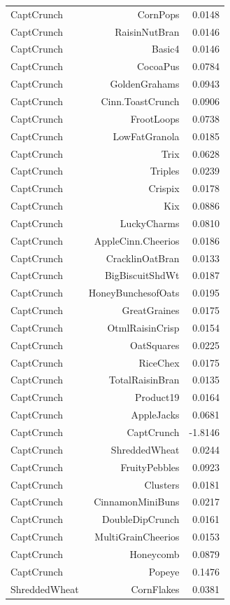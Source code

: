 \begin{longtable}{@{}lrr@{}}
CaptCrunch & CornPops & 0.0148 \\
CaptCrunch & RaisinNutBran & 0.0146 \\
CaptCrunch & Basic4 & 0.0146 \\
CaptCrunch & CocoaPus & 0.0784 \\
CaptCrunch & GoldenGrahams & 0.0943 \\
CaptCrunch & Cinn.ToastCrunch & 0.0906 \\
CaptCrunch & FrootLoops & 0.0738 \\
CaptCrunch & LowFatGranola & 0.0185 \\
CaptCrunch & Trix & 0.0628 \\
CaptCrunch & Triples & 0.0239 \\
CaptCrunch & Crispix & 0.0178 \\
CaptCrunch & Kix & 0.0886 \\
CaptCrunch & LuckyCharms & 0.0810 \\
CaptCrunch & AppleCinn.Cheerios & 0.0186 \\
CaptCrunch & CracklinOatBran & 0.0133 \\
CaptCrunch & BigBiscuitShdWt & 0.0187 \\
CaptCrunch & HoneyBunchesofOats & 0.0195 \\
CaptCrunch & GreatGraines & 0.0175 \\
CaptCrunch & OtmlRaisinCrisp & 0.0154 \\
CaptCrunch & OatSquares & 0.0225 \\
CaptCrunch & RiceChex & 0.0175 \\
CaptCrunch & TotalRaisinBran & 0.0135 \\
CaptCrunch & Product19 & 0.0164 \\
CaptCrunch & AppleJacks & 0.0681 \\
CaptCrunch & CaptCrunch & -1.8146 \\
CaptCrunch & ShreddedWheat & 0.0244 \\
CaptCrunch & FruityPebbles & 0.0923 \\
CaptCrunch & Clusters & 0.0181 \\
CaptCrunch & CinnamonMiniBuns & 0.0217 \\
CaptCrunch & DoubleDipCrunch & 0.0161 \\
CaptCrunch & MultiGrainCheerios & 0.0153 \\
CaptCrunch & Honeycomb & 0.0879 \\
CaptCrunch & Popeye & 0.1476 \\
ShreddedWheat & CornFlakes & 0.0381 \\

\end{longtable}
